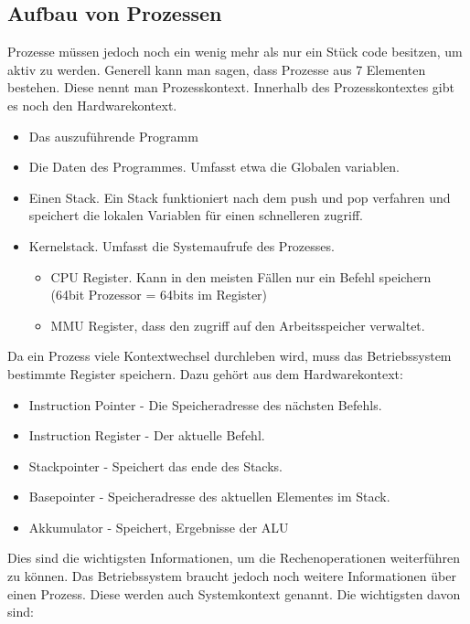 \subsection{Aufbau von Prozessen}

Prozesse müssen jedoch noch ein wenig mehr als nur ein Stück code besitzen, um aktiv zu werden. Generell kann man sagen, dass Prozesse aus 7 Elementen bestehen.
Diese nennt man Prozesskontext. Innerhalb des Prozesskontextes gibt es noch den Hardwarekontext.
\begin{itemize}
    \setlength\itemsep{0pt}
    \item Das auszuführende Programm
    \item Die Daten des Programmes. Umfasst etwa die Globalen variablen.
    \item Einen Stack. Ein Stack funktioniert nach dem push und pop verfahren und speichert die lokalen Variablen für einen schnelleren zugriff.
    \item Kernelstack. Umfasst die Systemaufrufe des Prozesses.
          \begin{itemize}
              \item CPU Register. Kann in den meisten Fällen nur ein Befehl speichern (64bit Prozessor = 64bits im Register)
              \item MMU Register, dass den zugriff auf den Arbeitsspeicher verwaltet.
          \end{itemize}
\end{itemize}

Da ein Prozess viele Kontextwechsel durchleben wird, muss das Betriebssystem bestimmte Register speichern. Dazu gehört aus dem Hardwarekontext:

\begin{itemize}
    \setlength\itemsep{0pt}
    \item Instruction Pointer - Die Speicheradresse des nächsten Befehls.
    \item Instruction Register - Der aktuelle Befehl.
    \item Stackpointer - Speichert das ende des Stacks.
    \item Basepointer - Speicheradresse des aktuellen Elementes im Stack.
    \item Akkumulator - Speichert, Ergebnisse der ALU
\end{itemize}

Dies sind die wichtigsten Informationen, um die Rechenoperationen weiterführen zu können. Das Betriebssystem braucht jedoch noch weitere Informationen über einen Prozess. Diese werden auch Systemkontext genannt. Die wichtigsten davon sind:

